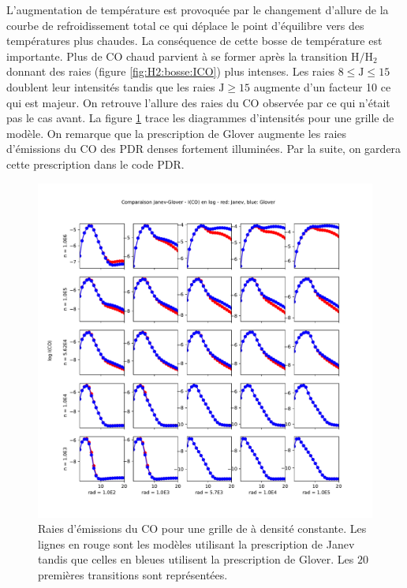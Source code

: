 L'augmentation de température est provoquée par le changement d'allure de la courbe de refroidissement total ce qui déplace le point d'équilibre vers des températures plus chaudes. La conséquence de cette \og bosse \fg{} de température est importante. Plus de $\mathrm{CO}$ chaud parvient à se former après la transition $\mathrm{H}/\mathrm{H}_2$ donnant des raies (figure \ref{fig:H2:bosse:ICO}) plus intenses. Les raies $ 8 \leq \mathrm{J}\leq 15$ doublent leur intensités tandis que les raies $\mathrm{J}\geq 15$ augmente d'un facteur 10 ce qui est majeur. On retrouve l'allure des raies du $\mathrm{CO}$ observée par \cite{Goicoechea2016} ce qui n'était pas le cas avant. La figure \ref{fig:H2:bosse:IgridCO} trace les diagrammes d'intensités pour une grille de modèle. On remarque que la prescription de Glover augmente les raies d'émissions du $\mathrm{CO}$ des PDR denses fortement illuminées. Par la suite, on gardera cette prescription dans le code PDR.


\begin{figure}[!p]
    \centering
    \includegraphics[trim = {0 0 0 3cm },clip,width=1\textwidth]{figure/H2/bosse_dcte_janevVSglover/PlotComp_Janev_Glover_IntCO.pdf}
    \caption{Raies d'émissions du $\mathrm{CO}$ pour une grille de à densité constante. Les lignes en rouge sont les modèles utilisant la prescription de Janev tandis que celles en bleues utilisent la prescription de Glover. Les $20$ premières transitions sont représentées.}
    \label{fig:H2:bosse:IgridCO}
\end{figure}




